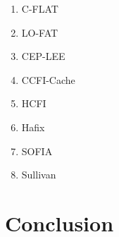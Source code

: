 \begin{enumerate}
	\item C-FLAT \cite{Abera2016}
	\item LO-FAT \cite{Dessouky2017}
	\item CEP-LEE \cite{Lee2019}
	\item CCFI-Cache \cite{Danger2018}
	\item HCFI \cite{Christoulakis2016}
	\item Hafix \cite{Davi2015}
	\item SOFIA \cite{DeClercq2017b}
	\item Sullivan \cite{Sullivan2016}
\end{enumerate}

\section{Conclusion}
